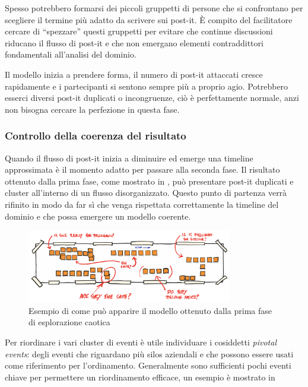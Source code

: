 Spesso potrebbero formarsi dei piccoli gruppetti di persone che si confrontano per scegliere il termine più adatto da scrivere sui post-it. È compito del facilitatore cercare di ``spezzare'' questi gruppetti per evitare che continue discussioni riducano il flusso di post-it e che non emergano elementi contraddittori fondamentali all'analisi del dominio.

Il modello inizia a prendere forma, il numero di post-it attaccati cresce rapidamente e i partecipanti si sentono sempre più a proprio agio. Potrebbero esserci diversi post-it duplicati o incongruenze, ciò è perfettamente normale, anzi non bisogna cercare la perfezione in questa fase. 

\subsubsection{Controllo della coerenza del risultato}
\label{sec:prima-riunione-controllo-della-coerenza-del-risultato}

Quando il flusso di post-it inizia a diminuire ed emerge una timeline approssimata è il momento adatto per passare alla seconda fase. Il risultato ottenuto dalla prima fase, come mostrato in , può presentare post-it duplicati e cluster all'interno di un flusso disorganizzato. Questo punto di partenza verrà rifinito in modo da far sì che venga rispettata correttamente la timeline del dominio e che possa emergere un modello coerente.

\begin{figure}[!ht]
  \centering
  \includegraphics[width=0.8\textwidth]{images/event-storming-exploration.png}
  \caption{Esempio di come può apparire il modello ottenuto dalla prima fase di esplorazione caotica}
  \label{fig:event-storming-exploration}
\end{figure}

Per riordinare i vari cluster di eventi è utile individuare i cosiddetti \emph{pivotal events}: degli eventi che riguardano più silos aziendali e che possono essere usati come riferimento per l'ordinamento. Generalmente sono sufficienti pochi eventi chiave per permettere un riordinamento efficace, un esempio è mostrato in 

